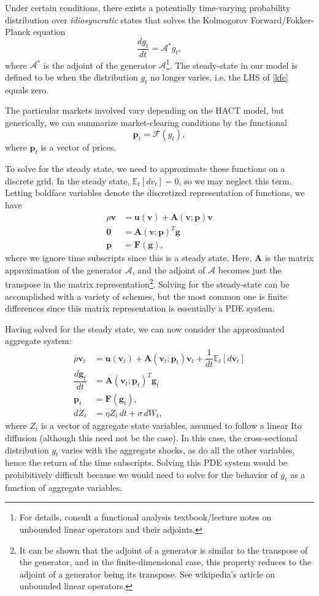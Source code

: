 \documentclass[12 pt, oneside]{article}
\theoremstyle{definition}
\theoremstyle{definition}
\theoremstyle{definition}
\newcommand{\bfg}{\mathbf{g}}
\newcommand{\bfp}{\mathbf{p}}
\newcommand{\bfu}{\mathbf{u}}
\newcommand{\bfv}{\mathbf{v}}
\newcommand{\bfA}{\mathbf{A}}
\newcommand{\bfF}{\mathbf{F}}
\newcommand{\bfzero}{\mathbf{0}}
\newcommand{\E}{\mathbb{E}}
\newcommand{\calA}{\mathcal{A}}
\newcommand{\calF}{\mathcal{F}}
\begin{document}
Under certain conditions, there exists a potentially time-varying probability distribution over \textit{idiosyncratic} states that solves the Kolmogorov Forward/Fokker-Planck equation
\begin{equation}  \label{kfe}
\dfrac{dg_t}{dt} = \calA^*g_t,
\end{equation}
where $\calA^*$ is the adjoint of the generator $\calA$\footnote{For details, consult a functional analysis textbook/lecture notes on unbounded linear operators and their adjoints.}. The steady-state in our model is defined to be when the distribution $g_t$ no longer varies, i.e. the LHS of \eqref{kfe} equals zero.

The particular markets involved vary depending on the HACT model, but generically, we can summarize market-clearing conditions by the functional
\begin{equation}\label{market clearing}
\bfp_t = \calF(g_t),
\end{equation}
where $\bfp_t$ is a vector of prices.

To solve for the steady state, we need to approximate these functions on a discrete grid. In the steady state, $\E_t[dv_t] = 0$, so we may neglect this term. Letting boldface variables denote the discretized representation of functions, we have
\begin{align*}
\rho \bfv & = \bfu(\bfv) + \bfA(\bfv;\bfp)\bfv\\
\bfzero & = \bfA(\bfv;\bfp)^T\bfg\\
\bfp & = \bfF(\bfg),
\end{align*}
where we ignore time subscripts since this is a steady state. Here, $\bfA$ is the matrix approximation of the generator $\calA$, and the adjoint of $\calA$ becomes just the transpose in the matrix representation\footnote{It can be shown that the adjoint of a generator is similar to the transpose of the generator, and in the finite-dimensional case, this property reduces to the adjoint of a generator being its transpose. See wikipedia's article on unbounded linear operators.}. Solving for the steady-state can be accomplished with a variety of schemes, but the most common one is finite differences since this matrix representation is essentially a PDE system.

Having solved for the steady state, we can now consider the approximated aggregate system:
\begin{align*}
\rho \bfv_t & = \bfu(\bfv_t) + \bfA(\bfv_t;\bfp_t)\bfv_t + \dfrac{1}{dt}\E_t[d\bfv_t]\\
\dfrac{d\bfg_t}{dt} & = \bfA(\bfv_t;\bfp_t)^T\bfg_t\\
\bfp_t & = \bfF(\bfg_t),\\
dZ_t & = \eta Z_t\,dt + \sigma\, dW_t,
\end{align*}
where $Z_t$ is a vector of aggregate state variables, assumed to follow a linear Ito diffusion (although this need not be the case). In this case, the cross-sectional distribution $g_t$ varies with the aggregate shocks, as do all the other variables, hence the return of the time subscripts. Solving this PDE system would be prohibitively difficult because we would need to solve for the behavior of $g_t$ as a function of aggregate variables.
\end{document}
